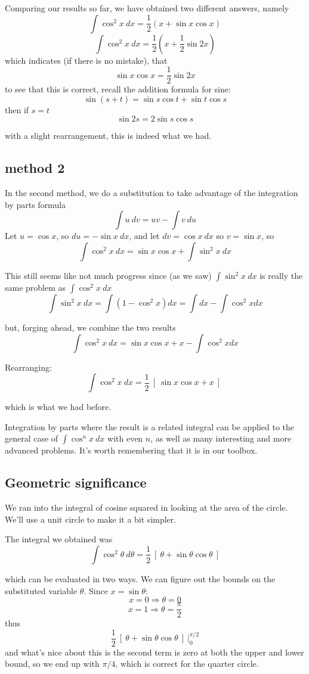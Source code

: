 \documentclass[11pt, oneside]{article}
\begin{document}
Comparing our results so far, we have obtained two different answers, namely
\[ \int \cos^2 x \ dx = \frac{1}{2} (x + \sin x \cos x) \]
\[ \int \cos^2 x \ dx = \frac{1}{2} ( x + \frac{1}{2} \sin 2x ) \]
which indicates (if there is no mistake), that
\[ \sin x \cos x = \frac{1}{2} \sin 2x  \]
to see that this is correct, recall the addition formula for sine:
\[ \sin (s+t) = \sin s \cos t + \sin t \cos s \]
then if $s=t$
\[ \sin 2s = 2 \sin s \cos s  \]

with a slight rearrangement, this is indeed what we had.

\subsection*{method 2}
In the second method, we do a substitution to take advantage of the integration by parts formula
\[ \int u \ dv = uv - \int v \ du \]
Let $u=\cos x$, so $du = -\sin x \ dx$, and let $dv = \cos x \ dx$ so $v= \sin x$, so
\[ \int \cos^2 x \ dx = \sin x \cos x + \int \sin^2 x \ dx \]

This still seems like not much progress since (as we saw) $\int \sin^2 x \ dx$ is really the same problem as $\int \cos^2 x \ dx$
\[ \int \sin^2 x \ dx = \int (1 - \cos^2 x) dx = \int dx - \int \cos^2 x dx \]

but, forging ahead, we combine the two results
\[ \int \cos^2 x \ dx = \sin x \cos x + x -  \int \cos^2 x dx \]

Rearranging:
\[ \int \cos^2 x \ dx  = \frac{1}{2} \ [ \ \sin x \cos x + x \ ] \ \]

which is what we had before.

Integration by parts where the result is a related integral can be applied to the general case of $\int \cos^n x \ dx$ with even $n$, as well as many interesting and more advanced problems.  It's worth remembering that it is in our toolbox.

\subsection*{Geometric significance}
We ran into the integral of cosine squared in looking at the area of the circle.  We'll use a unit circle to make it a bit simpler.

The integral we obtained was
\[ \int \cos^2 \theta \ d \theta = \frac{1}{2} \ [ \ \theta + \sin \theta \cos \theta \ ] \]

which can be evaluated in two ways.  We can figure out the bounds on the substituted variable $\theta$.  Since $x = \sin \theta$:
\[ x = 0 \Rightarrow \theta = 0 \]
\[ x = 1 \Rightarrow \theta = \frac{\pi}{2} \]
thus
\[ \frac{1}{2} \ [ \ \theta + \sin \theta \cos \theta \ ] \ \bigg |_0^{\pi/2} \]
and what's nice about this is the second term is zero at both the upper and lower bound, so we end up with $\pi/4$, which is correct for the quarter circle.
\end{document}
